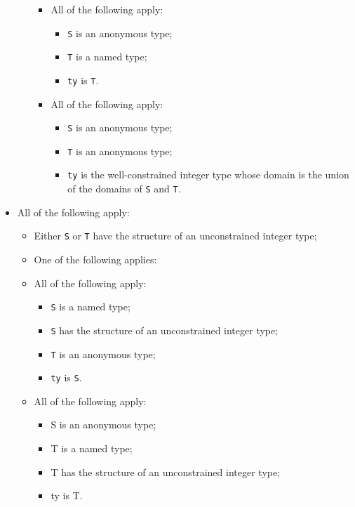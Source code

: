 \documentclass{book}
\begin{document}
\begin{itemize}
\begin{itemize}
\begin{itemize}
      \item All of the following apply:
        \begin{itemize}
        \item \texttt{S} is an anonymous type;
        \item \texttt{T} is a named type;
        \item \texttt{ty} is \texttt{T}.
        \end{itemize}

      \item All of the following apply:
        \begin{itemize}
        \item \texttt{S} is an anonymous type;
        \item \texttt{T} is an anonymous type;
	\item \texttt{ty} is the well-constrained integer type whose domain is the union of the
	  domains of \texttt{S} and \texttt{T}.
        \end{itemize}
      \end{itemize}
    \end{itemize}

  \item All of the following apply:
    \begin{itemize}
    \item Either \texttt{S} or \texttt{T} have the structure of an unconstrained integer type;
    \item One of the following applies:

      \item All of the following apply:
        \begin{itemize}
        \item \texttt{S} is a named type;
        \item \texttt{S} has the structure of an unconstrained integer type;
        \item \texttt{T} is an anonymous type;
        \item \texttt{ty} is \texttt{S}.
        \end{itemize}

      \item All of the following apply:
        \begin{itemize}
        \item S is an anonymous type;
        \item T is a named type;
        \item T has the structure of an unconstrained integer type;
        \item ty is T.
        \end{itemize}


\end{itemize}
\end{itemize}
\end{document}
